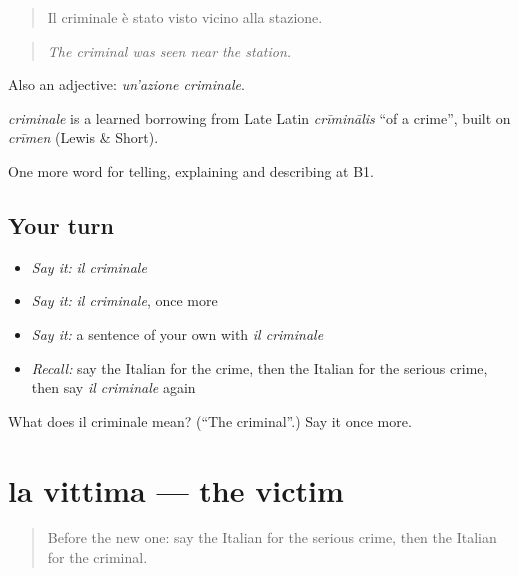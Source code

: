 \begin{quote}
Il criminale è stato visto vicino alla stazione.
\end{quote}

\begin{quote}
\emph{The criminal was seen near the station.}
\end{quote}

Also an adjective: \emph{un'azione criminale}.

\begin{cousinweb}
\emph{criminale} is a learned borrowing from Late Latin \emph{crīminālis} \textquotedblleft{}of a crime\textquotedblright{}, built on \emph{crīmen} (Lewis \& Short).
\end{cousinweb}

\begin{grammarlens}[title={What you've built}]
One more word for telling, explaining and describing at B1.
\end{grammarlens}

\subsection*{Your turn}
\begin{itemize}
\raggedright
  \item \emph{Say it:} \emph{il criminale}
  \item \emph{Say it:} \emph{il criminale}, once more
  \item \emph{Say it:} a sentence of your own with \emph{il criminale}
  \item \emph{Recall:} say the Italian for the crime, then the Italian for the serious crime, then say \emph{il criminale} again
\end{itemize}

\begin{tcolorbox}[breakable,colback=teal!4,colframe=teal!35!black,title={Before you move on}]
What does il criminale mean? (\textquotedblleft{}The criminal\textquotedblright{}.) Say it once more.
\end{tcolorbox}
\section[la vittima]{la vittima — the victim}

\label{lesson:IT-C290-vittima}



\begin{quote}
Before the new one: say the Italian for the serious crime, then the Italian for the criminal.
\end{quote}

